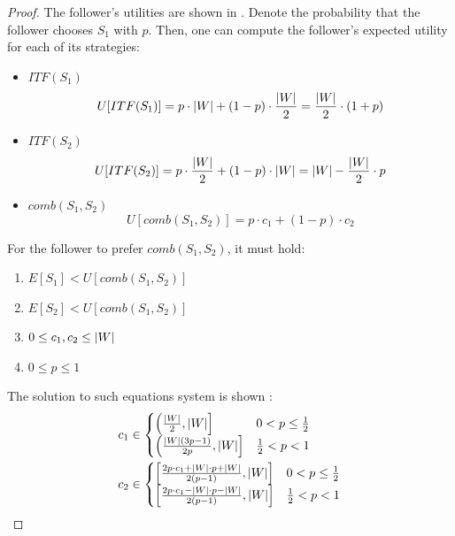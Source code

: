 \documentclass[a4paper,10pt]{article}
\newcommand{\w}{\ensuremath{W}\xspace}
\newcommand{\itf}{\ensuremath{ITF}\xspace}
\DeclarePairedDelimiter\abs{\lvert}{\rvert}%
\begin{document}
\begin{proof}
The follower's utilities are shown in .  Denote the probability that the follower chooses $S_1$ with $p$. Then, one can compute the follower's expected utility for each of its strategies:
\begin{itemize}
    \item $\itf(S_1)$
        \begin{equation*}
            U[\itf(S_1)]=p\cdot \abs*{\w} + (1-p)\cdot \frac{\abs*{\w}}{2} = \frac{\abs*{\w}}{2}\cdot \left(1+p\right)
        \end{equation*}
    \item $\itf(S_2)$
        \begin{equation*}
            U[\itf(S_2)]=p\cdot \frac{\abs*{\w}}{2} + (1-p)\cdot \abs*{\w} = \abs*{\w}-\frac{\abs*{\w}}{2}\cdot p
        \end{equation*}
    \item $comb(S_1,S_2)$
        \begin{equation*}
            U[comb(S_1,S_2)]=p\cdot c_1 + (1-p)\cdot c_2
        \end{equation*}
\end{itemize}

For the follower to prefer $comb(S_1,S_2)$, it must hold:
\begin{enumerate}
    \item $E[S_1] < U[comb(S_1,S_2)]$
    \item $E[S_2] < U[comb(S_1,S_2)]$
    \item $0 \leq c_1,c_2 \leq \abs*{\w}$
    \item $0 \leq p \leq 1$
\end{enumerate}
The solution to such equations system is shown :
\begin{equation}
\begin{aligned}
        c_1 &\in \begin{cases} 
        \left(\frac{\abs*{\w}}{2},\abs*{\w}\right] & 0 < p \leq \frac{1}{2} \\
        \left(\frac{\abs*{\w}(3p-1)}{2p} , \abs*{\w}\right] & \frac{1}{2} < p < 1
        \end{cases} \\
        c_2 &\in \begin{cases} 
        \left[\frac{2p\cdot c_1 + \abs*{\w}\cdot p + \abs*{\w}}{2(p-1)},\abs*{\w}\right] & 0 < p \leq \frac{1}{2} \\
        \left[\frac{2p\cdot c_1 - \abs*{\w}\cdot p - \abs*{\w}}{2(p-1)}, \abs*{\w}\right] & \frac{1}{2} < p < 1
        \end{cases}
    \end{aligned}
    \label{equations: two strategies results}
\end{equation}


\end{proof}
\end{document}
